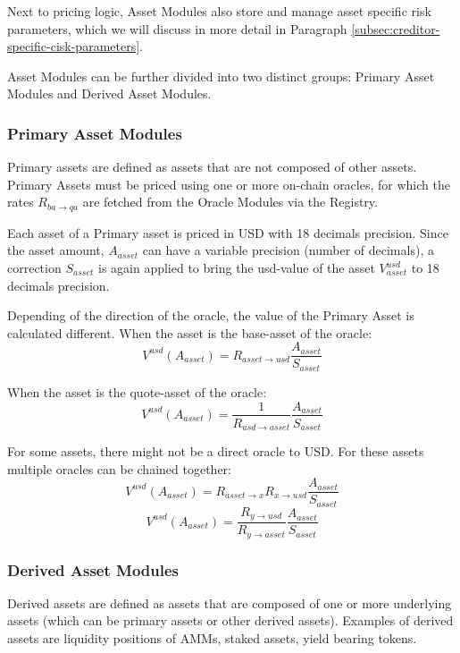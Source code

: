 \documentclass[sigconf,nonacm]{acmart}
\begin{document}
Next to pricing logic, Asset Modules also store and manage asset specific risk parameters, which we will discuss in more detail in Paragraph \ref{subsec:creditor-specific-cisk-parameters}.

Asset Modules can be further divided into two distinct groups: Primary Asset Modules and Derived Asset Modules.

\subsubsection{Primary Asset Modules}
Primary assets are defined as assets that are not composed of other assets.
Primary Assets must be priced using one or more on-chain oracles, for which the rates $R_{ba\rightarrow qa}$ are fetched from the Oracle Modules via the Registry.

Each asset of a Primary asset is priced in USD with 18 decimals precision.
Since the asset amount, $A_{asset}$ can have a variable precision (number of decimals), a correction $S_{asset}$ is again applied to bring the usd-value of the asset $V_{asset}^{usd}$ to 18 decimals precision.

Depending of the direction of the oracle, the value of the Primary Asset is calculated different.
When the asset is the base-asset of the oracle:
\begin{equation}
    V^{usd}(A_{asset}) = R_{asset\rightarrow usd} \frac{A_{asset}}{S_{asset}}
\end{equation}

When the asset is the quote-asset of the oracle:
\begin{equation}
    V^{usd}(A_{asset}) = \frac{1}{R_{usd\rightarrow asset}} \frac{A_{asset}}{S_{asset}}
\end{equation}

For some assets, there might not be a direct oracle to USD.
For these assets multiple oracles can be chained together:
\begin{equation}
    V^{usd}(A_{asset}) = R_{asset\rightarrow x} R_{x\rightarrow usd} \frac{A_{asset}}{S_{asset}}
\end{equation}
\begin{equation}
    V^{usd}(A_{asset}) = \frac{R_{y\rightarrow usd}}{R_{y\rightarrow asset}} \frac{A_{asset}}{S_{asset}}
\end{equation}

\subsubsection{Derived Asset Modules}
Derived assets are defined as assets that are composed of one or more underlying assets (which can be primary assets or other derived assets).
Examples of derived assets are liquidity positions of AMMs, staked assets, yield bearing tokens.
\end{document}
